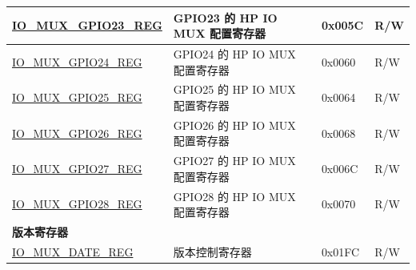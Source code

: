 \begin{longtable}{ | p{6cm} | p{7.2cm} | p{1.3cm} | p{1cm} | }
\hyperref[regdesc:IOMUXGPIONREG]{IO\_MUX\_GPIO23\_REG} & GPIO23 的 HP IO MUX 配置寄存器 & 0x005C & R/W \\ \hline
\hyperref[regdesc:IOMUXGPIONREG]{IO\_MUX\_GPIO24\_REG} & GPIO24 的 HP IO MUX 配置寄存器 & 0x0060 & R/W \\ \hline
\hyperref[regdesc:IOMUXGPIONREG]{IO\_MUX\_GPIO25\_REG} & GPIO25 的 HP IO MUX 配置寄存器 & 0x0064 & R/W \\ \hline
\hyperref[regdesc:IOMUXGPIONREG]{IO\_MUX\_GPIO26\_REG} & GPIO26 的 HP IO MUX 配置寄存器 & 0x0068 & R/W \\ \hline
\hyperref[regdesc:IOMUXGPIONREG]{IO\_MUX\_GPIO27\_REG} & GPIO27 的 HP IO MUX 配置寄存器 & 0x006C & R/W \\ \hline
\hyperref[regdesc:IOMUXGPIONREG]{IO\_MUX\_GPIO28\_REG} & GPIO28 的 HP IO MUX 配置寄存器 & 0x0070 & R/W \\ \hline
\multicolumn{4}{|l|}{\textbf{版本寄存器}} \\ \hline
\hyperref[regdesc:IOMUXDATEREG]{IO\_MUX\_DATE\_REG} & 版本控制寄存器 & 0x01FC & R/W \\ \hline
\end{longtable}
